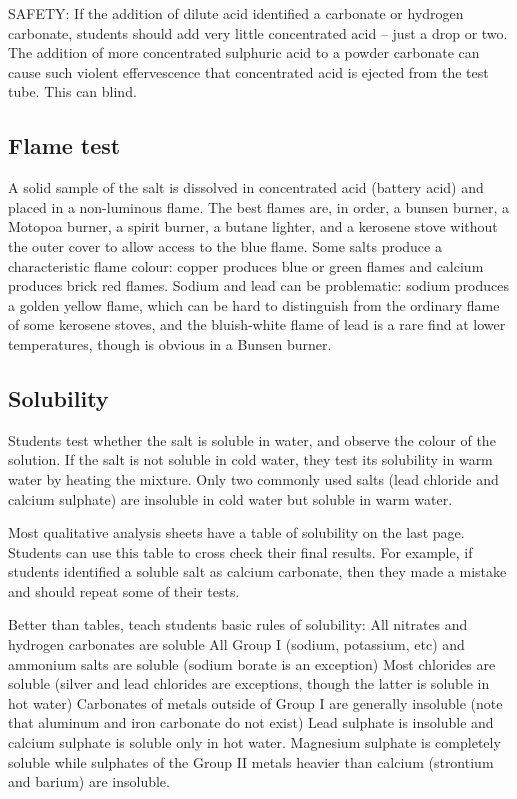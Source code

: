 SAFETY: If the addition of dilute acid identified 
a carbonate or hydrogen carbonate, 
students should add very little concentrated acid -- 
just a drop or two. 
The addition of more concentrated sulphuric acid 
to a powder carbonate can cause such violent effervescence 
that concentrated acid is ejected from the test tube. 
This can blind.

\subsection{Flame test}
A solid sample of the salt is dissolved in concentrated acid (battery acid) and placed in a non-luminous flame. 
The best flames are, 
in order, 
a bunsen burner, 
a Motopoa burner,
a spirit burner, 
a butane lighter, 
and a kerosene stove without the outer cover 
to allow access to the blue flame. 
Some salts produce a characteristic flame colour: 
copper produces blue or green flames and calcium produces brick red flames. 
Sodium and lead can be problematic: sodium produces a golden yellow flame, 
which can be hard to distinguish 
from the ordinary flame of some kerosene stoves, 
and the bluish-white flame of lead is a rare find at lower temperatures, 
though is obvious in a Bunsen burner.

\subsection{Solubility}
Students test whether the salt is soluble in water, 
and observe the colour of the solution. 
If the salt is not soluble in cold water, 
they test its solubility in warm water by heating the mixture. 
Only two commonly used salts 
(lead chloride and calcium sulphate) are insoluble in cold water 
but soluble in warm water. 

Most qualitative analysis sheets have a table of solubility on the last page. 
Students can use this table to cross check their final results. 
For example, 
if students identified a soluble salt as calcium carbonate, 
then they made a mistake and should repeat some of their tests.

Better than tables, 
teach students basic rules of solubility:
All nitrates and hydrogen carbonates are soluble
All Group I (sodium, 
potassium, 
etc) and ammonium salts are soluble (sodium borate is an exception)
Most chlorides are soluble (silver and lead chlorides are exceptions, 
though the latter is soluble in hot water)
Carbonates of metals outside of Group I are generally insoluble 
(note that aluminum and iron carbonate do not exist)
Lead sulphate is insoluble and calcium sulphate is soluble only in hot water. 
Magnesium sulphate is completely soluble 
while sulphates of the Group II metals heavier than calcium 
(strontium and barium) are insoluble.

